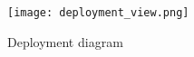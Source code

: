 \documentclass[../../main.tex]{subfiles}
\begin{document}
\begin{figure}[H]
    \centering
    \texttt{[image: deployment\_view.png]}
    \caption{
        Deployment diagram
    }
\end{figure}
\end{document}
